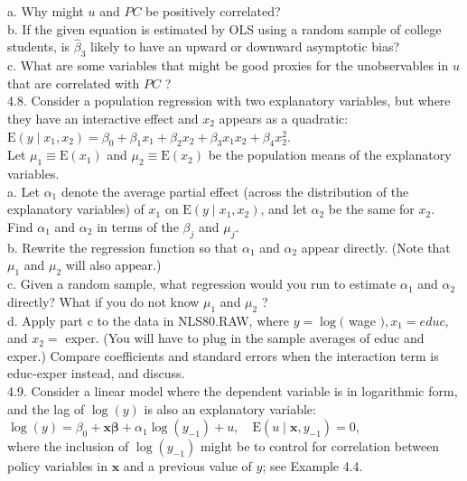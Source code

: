 \documentclass[10pt]{article}
\begin{document}
a. Why might $u$ and $P C$ be positively correlated?\\
b. If the given equation is estimated by OLS using a random sample of college students, is $\hat{\beta}_{3}$ likely to have an upward or downward asymptotic bias?\\
c. What are some variables that might be good proxies for the unobservables in $u$ that are correlated with $P C$ ?\\
4.8. Consider a population regression with two explanatory variables, but where they have an interactive effect and $x_{2}$ appears as a quadratic:\\
$\mathrm{E}\left(y \mid x_{1}, x_{2}\right)=\beta_{0}+\beta_{1} x_{1}+\beta_{2} x_{2}+\beta_{3} x_{1} x_{2}+\beta_{4} x_{2}^{2}$.\\
Let $\mu_{1} \equiv \mathrm{E}\left(x_{1}\right)$ and $\mu_{2} \equiv \mathrm{E}\left(x_{2}\right)$ be the population means of the explanatory variables.\\
a. Let $\alpha_{1}$ denote the average partial effect (across the distribution of the explanatory variables) of $x_{1}$ on $\mathrm{E}\left(y \mid x_{1}, x_{2}\right)$, and let $\alpha_{2}$ be the same for $x_{2}$. Find $\alpha_{1}$ and $\alpha_{2}$ in terms of the $\beta_{j}$ and $\mu_{j}$.\\
b. Rewrite the regression function so that $\alpha_{1}$ and $\alpha_{2}$ appear directly. (Note that $\mu_{1}$ and $\mu_{2}$ will also appear.)\\
c. Given a random sample, what regression would you run to estimate $\alpha_{1}$ and $\alpha_{2}$ directly? What if you do not know $\mu_{1}$ and $\mu_{2}$ ?\\
d. Apply part c to the data in NLS80.RAW, where $y=\log ($ wage $), x_{1}=e d u c$, and $x_{2}=$ exper. (You will have to plug in the sample averages of educ and exper.) Compare coefficients and standard errors when the interaction term is educ-exper instead, and discuss.\\
4.9. Consider a linear model where the dependent variable is in logarithmic form, and the lag of $\log (y)$ is also an explanatory variable:\\
$\log (y)=\beta_{0}+\mathbf{x} \boldsymbol{\beta}+\alpha_{1} \log \left(y_{-1}\right)+u, \quad \mathrm{E}\left(u \mid \mathbf{x}, y_{-1}\right)=0$,\\
where the inclusion of $\log \left(y_{-1}\right)$ might be to control for correlation between policy variables in $\mathbf{x}$ and a previous value of $y$; see Example 4.4.\\
\end{document}
